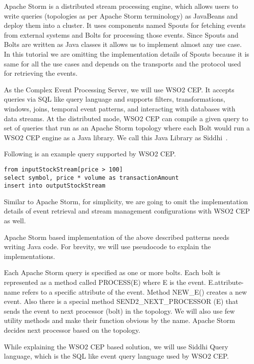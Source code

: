 \documentclass{sig-alternate}
\begin{document}
{Apache Storm is a distributed stream processing engine, which allows users to write queries (topologies as per Apache Storm terminology) as JavaBeans and deploy them into a cluster. It uses components named Spouts for fetching events from external systems and Bolts for processing those events. Since Spouts and Bolts are written as Java classes it allows us to implement almost any use case. In this tutorial we are omitting the implementation details of Spouts because it is same for all the use cases and depends on the transports and the protocol used for retrieving the events. 

As the Complex Event Processing Server, we will use WSO2 CEP. It accepts queries via SQL like query language and supports filters, transformations, windows, joins, temporal event patterns, and interacting with databases with data streams. At the distributed mode, WSO2 CEP can compile a given query to set of queries that run as an Apache Storm topology where each Bolt would run a WSO2 CEP engine as a Java library. We call this Java Library as Siddhi~\cite{siddhilib}.

Following is an example query supported by WSO2 CEP. 

\lstset{language=siddhi}
\begin{lstlisting}[mathescape]
from inputStockStream[price > 100]
select symbol, price * volume as transactionAmount
insert into outputStockStream
\end{lstlisting}


Similar to Apache Storm, for simplicity, we are going to omit the implementation details of event retrieval and stream management configurations with WSO2 CEP as well. 

Apache Storm based implementation of the above described patterns needs writing Java code. For brevity, we will use pseudocode to explain the implementations. 

Each Apache Storm query is specified as one or more bolts. Each bolt is represented as a method called PROCESS(E) where E is the event. E.attribute-name refers to a specific attribute of the event. Method NEW\_E() creates a new event. Also there is a special method SEND2\_NEXT\_PROCESSOR (E) that sends the event to next processor (bolt) in the topology.  We will also use few utility methods and make their function obvious by the name. Apache Storm decides next processor based on the topology. 

While explaining the WSO2 CEP based solution, we will use Siddhi Query language, which is the SQL like event query language used by WSO2 CEP. 


}
\end{document}
